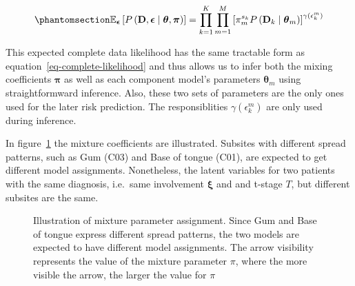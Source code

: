 \documentclass[
  sn-mathphys-num,
]{sn-jnl}
\begin{document}
\begin{equation}\phantomsection\label{eq-expected-complete-likelihood}{
\mathbb{E}_{\boldsymbol{\epsilon}} \left[ P \left( \mathbf{D}, \boldsymbol{\epsilon} \mid \boldsymbol{\theta}, \boldsymbol{\pi} \right) \right] = \prod_{k=1}^K \prod_{m=1}^M \left[ \pi_m^{s_k} P \left( \mathbf{D}_k \mid \boldsymbol{\theta}_m \right) \right]^{\gamma(\epsilon_k^m)}
}\end{equation}

This expected complete data likelihood has the same tractable form as
equation~\ref{eq-complete-likelihood} and thus allows us to infer both
the mixing coefficients \(\boldsymbol{\pi}\) as well as each component
model's parameters \(\boldsymbol{\theta}_m\) using straightformward
inference. Also, these two sets of parameters are the only ones used for
the later risk prediction. The responsiblities \(\gamma(\epsilon_k^m)\)
are only used during inference.

In figure~\ref{fig-model-simple} the mixture coefficients are
illustrated. Subsites with different spread patterns, such as Gum (C03)
and Base of tongue (C01), are expected to get different model
assignments. Nonetheless, the latent variables for two patients with the
same diagnosis, i.e.~same involvement \(\boldsymbol{\xi}\) and and
t-stage \(T\), but different subsites are the same.

\begin{figure}


\caption{\label{fig-model-simple}Illustration of mixture parameter
assignment. Since Gum and Base of tongue express different spread
patterns, the two models are expected to have different model
assignments. The arrow visibility represents the value of the mixture
parameter \(\pi\), where the more visible the arrow, the larger the
value for \(\pi\)}

\end{figure}%
\end{document}
